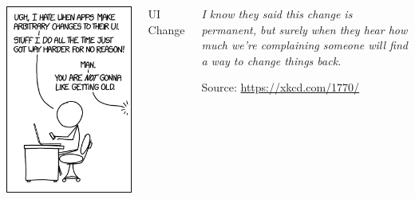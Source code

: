 
\begin{frame}[t,plain]
\titlepage
\end{frame}


\begin{frame}
%
\begin{columns}[T]
\begin{center}
	\includegraphics[width=.67\linewidth]{./gfx/12-xkcd-change}
\end{center}
%
\begin{Large}
	{UI Change}
\end{Large}
%
\begin{center}
	\vspace{60pt}
	\emph{I know they said this change is permanent, but surely when they hear how much we're complaining someone will find a way to change things back.}

	\vspace{6pt}
	Source: \url{https://xkcd.com/1770/}
\end{center}
\end{columns}

%
\end{frame}

